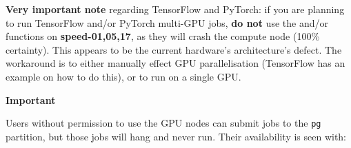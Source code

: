 \noindent
\textbf{Very important note} regarding TensorFlow and PyTorch: 
if you are planning to run TensorFlow and/or PyTorch multi-GPU jobs, 
\textbf{do not} use the  and/or\\
functions on \textbf{speed-01,05,17}, as they will crash the compute node (100\% certainty). 
This appears to be the current hardware's architecture's defect.
%
The workaround is to either
manually effect GPU parallelisation (TensorFlow has an example on how to
do this), or to run on a single GPU.

\vspace{10pt}
\noindent
\textbf{Important}
\vspace{10pt}

Users without permission to use the GPU nodes can submit jobs to the \texttt{pg}
partition, but those jobs will hang and never run.
%
Their availability is seen with:
%

